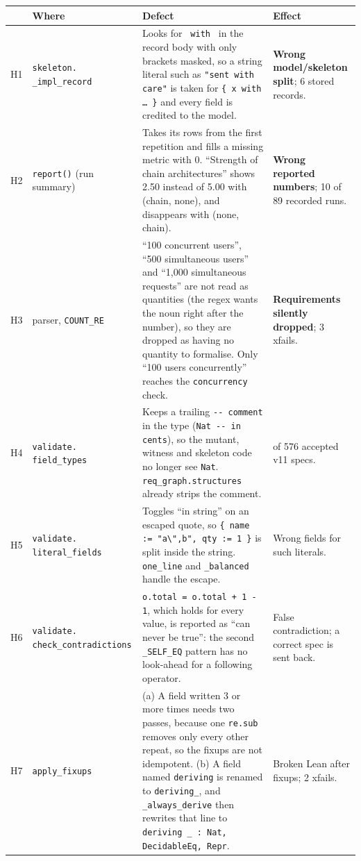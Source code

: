 \documentclass[11pt,a4paper]{article}
\newcommand{\code}[1]{\texttt{#1}}
\begin{document}
\begin{small}
\begin{longtable}{@{}>{\raggedright\arraybackslash}p{0.6cm}>{\raggedright\arraybackslash}p{3.4cm}>{\raggedright\arraybackslash}p{7.6cm}>{\raggedright\arraybackslash}p{3.0cm}@{}}
\toprule
& Where & Defect & Effect \\
\midrule
\endhead
H1 & \code{skeleton.} \code{\_impl\_record} &
  Looks for \code{ with } in the record body with only brackets masked, so a string literal such as
  \code{"sent with care"} is taken for \code{\{ x with … \}} and every field is credited to the model. &
  \textbf{Wrong model/skeleton split}; 6 stored records. \\
H2 & \code{report()} (run summary) &
  Takes its rows from the first repetition and fills a missing metric with 0. ``Strength of chain
  architectures'' shows 2.50 instead of 5.00 with (chain, none), and disappears with (none, chain). &
  \textbf{Wrong reported numbers}; 10 of 89 recorded runs. \\
H3 & parser, \code{COUNT\_RE} &
  ``100 concurrent users'', ``500 simultaneous users'' and ``1,000 simultaneous requests'' are not
  read as quantities (the regex wants the noun right after the number), so they are dropped as having
  no quantity to formalise. Only ``100 users concurrently'' reaches the \code{concurrency} check. &
  \textbf{Requirements silently dropped}; 3 xfails. \\
H4 & \code{validate.} \code{field\_types} &
  Keeps a trailing \code{-{}- comment} in the type (\code{Nat -{}- in cents}), so the mutant, witness and
  skeleton code no longer see \code{Nat}. \code{req\_graph.structures} already strips the comment. &
  7 of 576 accepted v11 specs. \\
H5 & \code{validate.} \code{literal\_fields} &
  Toggles ``in string'' on an escaped quote, so \code{\{ name := "a\textbackslash",b", qty := 1 \}} is
  split inside the string. \code{one\_line} and \code{\_balanced} handle the escape. &
  Wrong fields for such literals. \\
H6 & \code{validate.} \code{check\_}\allowbreak\code{contradictions} &
  \code{o.total = o.total + 1 - 1}, which holds for every value, is reported as ``can never be true'':
  the second \code{\_SELF\_EQ} pattern has no look-ahead for a following operator. &
  False contradiction; a correct spec is sent back. \\
H7 & \code{apply\_fixups} &
  (a) A field written 3 or more times needs two passes, because one \code{re.sub} removes only every
  other repeat, so the fixups are not idempotent. (b) A field named \code{deriving} is renamed to
  \code{deriving\_}, and \code{\_always\_derive} then rewrites that line to
  \code{deriving \_ : Nat,} \code{DecidableEq, Repr}. &
  Broken Lean after fixups; 2 xfails. \\
\bottomrule
\end{longtable}
\end{small}
\end{document}
